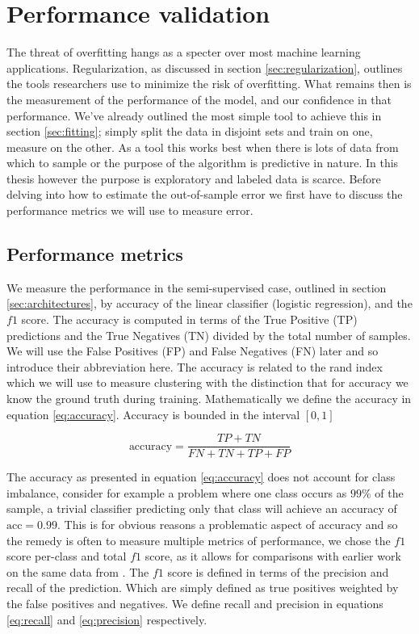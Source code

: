 \section{Performance validation}\label{sec:performance_val}

The threat of overfitting hangs as a specter over most machine learning applications. Regularization, as discussed in section \ref{sec:regularization}, outlines the tools researchers use to minimize the risk of overfitting. What remains then is the measurement of the performance of the model, and our confidence in that performance. We've already outlined the most simple tool to achieve this in section \ref{sec:fitting}; simply split the data in disjoint sets and train on one, measure on the other. As a tool this works best when there is lots of data from which to sample or the purpose of the algorithm is predictive in nature. In this thesis however the purpose is exploratory and labeled data is scarce. Before delving into how to estimate the out-of-sample error we first have to discuss the performance metrics we will use to measure error. 

\subsection{Performance metrics}

We measure the performance in the semi-supervised case, outlined in section \ref{sec:architectures}, by accuracy of the linear classifier (logistic regression), and the $f1$ score.  The accuracy is computed in terms of  the True Positive (TP) predictions and the True Negatives (TN) divided by the total number of samples. We will use the False Positives (FP) and False Negatives (FN) later and so introduce their abbreviation here. The accuracy is related to the rand index which we will use to measure clustering with the distinction that for accuracy we know the ground truth during training. Mathematically we define the accuracy in equation \ref{eq:accuracy}. Accuracy is bounded in the interval $[0, 1]$

\begin{equation}\label{eq:accuracy}
\text{accuracy} = \frac{TP + TN}{FN+ TN + TP+FP}
\end{equation}

\noindent The accuracy as presented in equation \ref{eq:accuracy} does not account for class imbalance, consider for example a problem where one class occurs as $99\%$ of the sample, a trivial classifier predicting only that class will achieve an accuracy of $\text{acc}=0.99$. This is for obvious reasons a problematic aspect of accuracy and so the remedy is often to measure multiple metrics of performance, we chose the $f1$ score per-class and total $f1$ score, as it allows for comparisons with earlier work on the same data from \citet{Kuchera2019}. The $f1$ score is defined in terms of the precision and recall of the prediction. Which are simply defined as true positives weighted by the false positives and negatives. We define recall and precision in equations \ref{eq:recall} and \ref{eq:precision} respectively.

